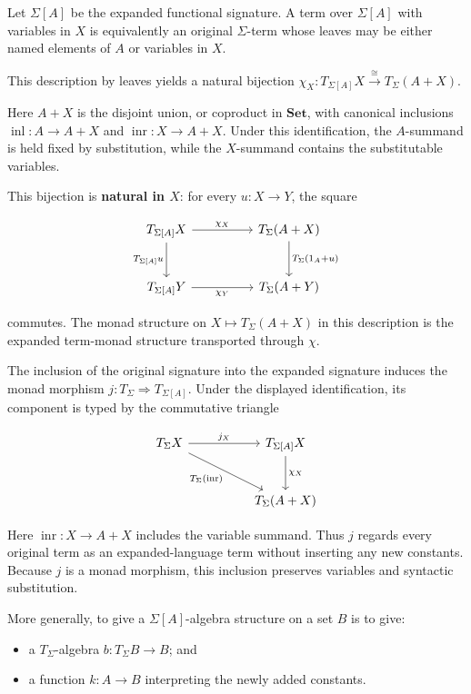 \documentclass[11pt]{article}
\newcommand{\tightlist}{\setlength{\itemsep}{0pt}%
  \setlength{\parskip}{0pt}}
\begin{document}
Let \(\Sigma[A]\) be the expanded functional signature. A term over
\(\Sigma[A]\) with variables in \(X\) is equivalently an original
\(\Sigma\)-term whose leaves may be either named elements of \(A\) or
variables in \(X\).

This description by leaves yields a natural bijection
\(\chi_X:T_{\Sigma[A]}X\xrightarrow{\cong}T_\Sigma(A+X)\).

Here \(A+X\) is the disjoint union, or coproduct in \(\mathbf{Set}\),
with canonical inclusions \(\operatorname{inl}:A\to A+X\) and
\(\operatorname{inr}:X\to A+X\). Under this identification, the
\(A\)-summand is held fixed by substitution, while the \(X\)-summand
contains the substitutable variables.

This bijection is \textbf{natural in \(X\)}: for every \(u:X\to Y\), the
square

\[
\begin{tikzcd}[row sep=large,column sep=huge]
T_{\Sigma[A]}X \arrow[r,"\chi_X"] \arrow[d,"T_{\Sigma[A]}u"'] &
T_\Sigma(A+X) \arrow[d,"T_\Sigma(1_A+u)"] \\
T_{\Sigma[A]}Y \arrow[r,"\chi_Y"'] & T_\Sigma(A+Y)
\end{tikzcd}
\]

commutes. The monad structure on \(X\mapsto T_\Sigma(A+X)\) in this
description is the expanded term-monad structure transported through
\(\chi\).

The inclusion of the original signature into the expanded signature induces
the monad morphism \(j:T_\Sigma\Rightarrow T_{\Sigma[A]}\). Under the
displayed identification, its component is typed by the commutative triangle

\[
\begin{tikzcd}[row sep=large,column sep=huge]
T_\Sigma X \arrow[r,"j_X"]
  \arrow[dr,"T_\Sigma(\operatorname{inr})"'] &
T_{\Sigma[A]}X \arrow[d,"\chi_X"] \\
& T_\Sigma(A+X)
\end{tikzcd}
\]

Here \(\operatorname{inr}:X\to A+X\) includes the variable summand.
Thus \(j\) regards every original term as an expanded-language term
without inserting any new constants. Because \(j\) is a monad morphism,
this inclusion preserves variables and syntactic substitution.

More generally, to give a \(\Sigma[A]\)-algebra structure on a set \(B\)
is to give:

\begin{itemize}
\tightlist
\item
  a \(T_\Sigma\)-algebra \(b:T_\Sigma B\to B\); and
\item
  a function \(k:A\to B\) interpreting the newly added constants.
\end{itemize}
\end{document}
